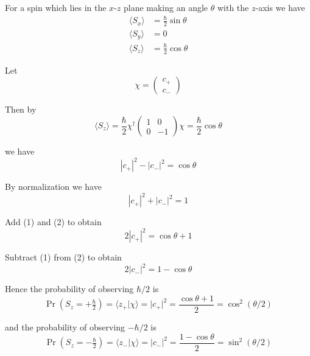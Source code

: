


\bigskip
For a spin which lies in the $x$-$z$ plane
making an angle $\theta$ with the $z$-axis we have
\begin{align*}
\langle S_x\rangle&=\frac{\hbar}{2}\sin\theta
\\
\langle S_y\rangle&=0
\\
\langle S_z\rangle&=\frac{\hbar}{2}\cos\theta
\end{align*}

Let
\begin{equation*}
\chi=\begin{pmatrix}c_+\\c_-\end{pmatrix}
\end{equation*}

Then by
\begin{equation*}
\langle S_z\rangle=\frac{\hbar}{2}\chi^\dag
\begin{pmatrix}1&0\\0&-1\end{pmatrix}
\chi=\frac{\hbar}{2}\cos\theta
\end{equation*}

we have
\begin{equation*}
|c_+|^2-|c_-|^2=\cos\theta\tag{1}
\end{equation*}

By normalization we have
\begin{equation*}
|c_+|^2+|c_-|^2=1\tag{2}
\end{equation*}

Add (1) and (2) to obtain
\begin{equation*}
2|c_+|^2=\cos\theta+1
\end{equation*}

Subtract (1) from (2) to obtain
\begin{equation*}
2|c_-|^2=1-\cos\theta
\end{equation*}

Hence the probability of observing $\hbar/2$ is
\begin{equation*}
\Pr\left(S_z=+\tfrac{\hbar}{2}\right)=\langle z_+|\chi\rangle
=|c_+|^2=\frac{\cos\theta+1}{2}=\cos^2(\theta/2)
\end{equation*}

and the probability of observing $-\hbar/2$ is
\begin{equation*}
\Pr\left(S_z=-\tfrac{\hbar}{2}\right)=\langle z_-|\chi\rangle
=|c_-|^2=\frac{1-\cos\theta}{2}=\sin^2(\theta/2)
\end{equation*}


